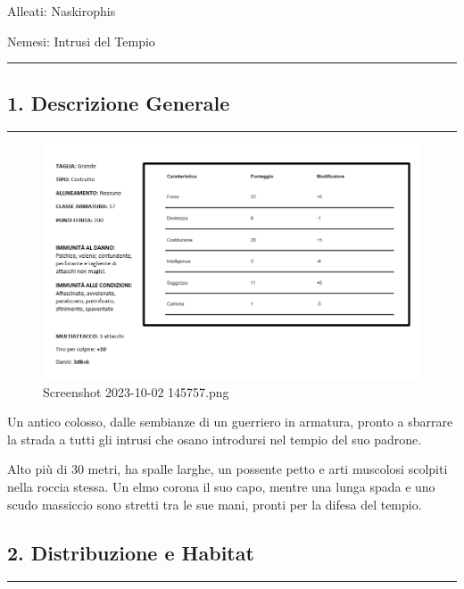 Alleati: Naskirophis

Nemesi: Intrusi del Tempio

\begin{center}\rule{0.5\linewidth}{0.5pt}\end{center}

\subsection{1. Descrizione Generale}\label{descrizione-generale}

\begin{center}\rule{0.5\linewidth}{0.5pt}\end{center}

\begin{figure}
\centering
\includegraphics{Screenshot_2023-10-02_145757.png}
\caption{Screenshot 2023-10-02 145757.png}
\end{figure}

Un antico colosso, dalle sembianze di un guerriero in armatura, pronto a
sbarrare la strada a tutti gli intrusi che osano introdursi nel tempio
del suo padrone.

Alto più di 30 metri, ha spalle larghe, un possente petto e arti
muscolosi scolpiti nella roccia stessa. Un elmo corona il suo capo,
mentre una lunga spada e uno scudo massiccio sono stretti tra le sue
mani, pronti per la difesa del tempio.

\subsection{2. Distribuzione e Habitat}\label{distribuzione-e-habitat}

\begin{center}\rule{0.5\linewidth}{0.5pt}\end{center}

